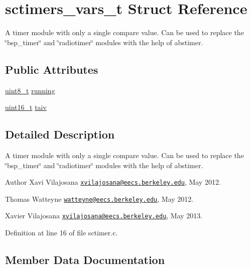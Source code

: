 \hypertarget{structsctimers__vars__t}{}\section{sctimers\+\_\+vars\+\_\+t Struct Reference}
\label{structsctimers__vars__t}


A timer module with only a single compare value. Can be used to replace the \char`\"{}bsp\+\_\+timer\char`\"{} and \char`\"{}radiotimer\char`\"{} modules with the help of abstimer.  


\subsection*{Public Attributes}
\begin{DoxyCompactItemize}
\item 
\hyperlink{_p_e___types_8h_aba7bc1797add20fe3efdf37ced1182c5}{uint8\+\_\+t} \hyperlink{structsctimers__vars__t_a87a6fbe92af71397c7aa34f2372838e5}{running}
\item 
\hyperlink{_p_e___types_8h_a1f1825b69244eb3ad2c7165ddc99c956}{uint16\+\_\+t} \hyperlink{structsctimers__vars__t_a8add2ed664d7980fb33696d616ae8dbf}{taiv}
\end{DoxyCompactItemize}


\subsection{Detailed Description}
A timer module with only a single compare value. Can be used to replace the \char`\"{}bsp\+\_\+timer\char`\"{} and \char`\"{}radiotimer\char`\"{} modules with the help of abstimer. 

\begin{DoxyAuthor}{Author}
Xavi Vilajosana \href{mailto:xvilajosana@eecs.berkeley.edu}{\tt xvilajosana@eecs.\+berkeley.\+edu}, May 2012. 

Thomas Watteyne \href{mailto:watteyne@eecs.berkeley.edu}{\tt watteyne@eecs.\+berkeley.\+edu}, May 2012.

Xavier Vilajosana \href{mailto:xvilajosana@eecs.berkeley.edu}{\tt xvilajosana@eecs.\+berkeley.\+edu}, May 2013. 
\end{DoxyAuthor}


Definition at line 16 of file sctimer.\+c.



\subsection{Member Data Documentation}
